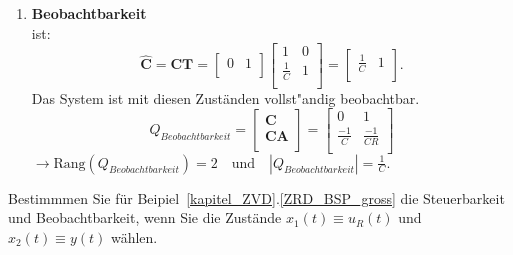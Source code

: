 {\begin{enumerate}
\begin{equation*}
Q_{Steuerbarkeit}=\left [ \boldsymbol{
\begin{array}{cc}
 B & AB
\end{array}}\right ]=\left [ 
\begin{array}{cc}
\frac{1}{L} & -\frac{2R}{L^2} \\
\frac{1}{CR} & \frac{-1}{L}-\frac{1}{C^2R^2} \\
\end{array}\right ] 
\end{equation*}
$\rightarrow \text{Rang}(Q_{Steuerbarkeit})=1 \quad\text{und} \quad \left |  Q_{Steuerbarkeit}\right | =0. $
\item[]{\bf Beobachtbarkeit}\\
 ist:
\begin{equation*}
\boldsymbol{\hat{C}}=\boldsymbol{CT}=\left [
\begin{array}{cc}
 0  & 1\\
\end{array}
\right ]
\left [
\begin{array}{cc}
 1 & 0\\
\frac{1}{C} & 1 \\
\end{array}
\right ]=\left [
\begin{array}{cc}
 \frac{1}{C} & 1 \\
\end{array}
\right ].
\end{equation*}
Das System ist mit diesen Zust\"anden vollst"andig beobachtbar. \\
\begin{equation*}
Q_{Beobachtbarkeit}=\left [ \boldsymbol{
\begin{array}{c}
 C  \\
CA\\
\end{array}}\right ]=\left [ 
\begin{array}{cc}
0 & 1 \\
\frac{-1}{C} & \frac{-1}{CR} \\
\end{array}\right ] 
\end{equation*}
$\rightarrow \text{Rang}(Q_{Beobachtbarkeit})=2 \quad\text{und} \quad \left |  Q_{Beobachtbarkeit}\right | =\frac{1}{C}. $
\end{enumerate}

\aufg Bestimmmen Sie f\"ur Beipiel~\ref{kapitel_ZVD}.\ref{ZRD_BSP_gross} die Steuerbarkeit und Beobachtbarkeit, wenn Sie die Zust\"ande $x_1(t)\equiv u_R(t)$ und $x_2(t)\equiv y(t)$ w\"ahlen.%

}
